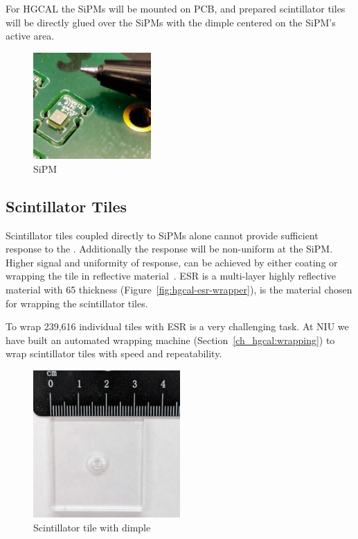 For \gls{HGCAL} the \glspl{SiPM} will be mounted on \gls{PCB},
and prepared scintillator tiles will be directly glued
over the \glspl{SiPM} with the dimple centered on the \gls{SiPM}'s active area.

\begin{figure}[!ht]
  \centering
  \includegraphics[width=0.4\textwidth]{figures/hgcal/sipm.jpg}
  \caption[SiPM]{SiPM}%
  \label{fig:hgcal-sipm}
\end{figure}

\subsection{
  Scintillator Tiles
}\label{ch_hgcal:scint-tiles}

Scintillator tiles coupled directly to \glspl{SiPM} alone cannot provide
sufficient response to the .
Additionally
the response will be non-uniform at the \gls{SiPM}. Higher
signal and uniformity of response, can be achieved by either coating or wrapping the tile in reflective
material~\cite{niu-sipm-on-tile}. \gls{ESR}
is a multi-layer highly reflective material with 65\micron{} thickness (Figure~\ref{fig:hgcal-esr-wrapper}), is the material chosen for wrapping the scintillator tiles.

To wrap 239,616 individual tiles  with \gls{ESR} is a very challenging task.
At NIU we have built an automated wrapping machine (Section~\ref{ch_hgcal:wrapping}) to
wrap scintillator tiles with speed and repeatability.

\begin{figure}[!ht]
  \centering
  \includegraphics[width=0.5\textwidth]{figures/hgcal/tile_19.jpg}
  \caption[Scintillator tile with dimple]{Scintillator tile with dimple}%
  \label{fig:hgcal-scintillator-tile}
\end{figure}


